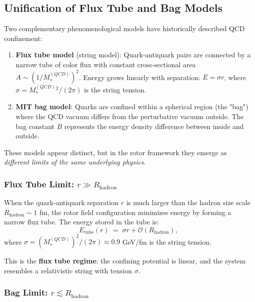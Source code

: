 \documentclass[11pt,a4paper]{article}
\theoremstyle{definition}
\theoremstyle{plain}
\theoremstyle{remark}
\begin{document}
\subsection{Unification of Flux Tube and Bag Models}

Two complementary phenomenological models have historically described QCD confinement:

\begin{enumerate}
  \item \textbf{Flux tube model} (string model): Quark-antiquark pairs are connected by a narrow tube of color flux with constant cross-sectional area $A \sim (1/M_*^{(QCD)})^2$. Energy grows linearly with separation: $E = \sigma r$, where $\sigma = M_*^{(QCD)} {}^2 /(2\pi)$ is the string tension.

  \item \textbf{MIT bag model}: Quarks are confined within a spherical region (the "bag") where the QCD vacuum differs from the perturbative vacuum outside. The bag constant $B$ represents the energy density difference between inside and outside.
\end{enumerate}

These models appear distinct, but in the rotor framework they emerge as \emph{different limits of the same underlying physics}.

\subsubsection{Flux Tube Limit: $r \gg R_{\mathrm{hadron}}$}

When the quark-antiquark separation $r$ is much larger than the hadron size scale $R_{\mathrm{hadron}} \sim 1$ fm, the rotor field configuration minimizes energy by forming a narrow flux tube. The energy stored in the tube is:
\begin{equation}
E_{\mathrm{tube}}(r) \;=\; \sigma r + \mathcal{O}(R_{\mathrm{hadron}}),
\end{equation}
where $\sigma = (M_*^{(QCD)})^2 / (2\pi) \approx 0.9$ GeV/fm is the string tension.

This is the \textbf{flux tube regime}: the confining potential is linear, and the system resembles a relativistic string with tension $\sigma$.

\subsubsection{Bag Limit: $r \lesssim R_{\mathrm{hadron}}$}
\end{document}
